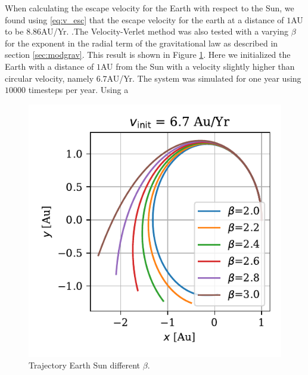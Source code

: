 \documentclass[twocolumn]{aastex62}
\begin{document}
When calculating the escape velocity for the Earth with respect to the Sun, we
found using \ref{eq:v_esc} that the escape velocity for the earth at a distance
of $1$AU to be $8.86$AU/Yr. .The Velocity-Verlet method was also tested with a varying $\beta$ for the
exponent in the radial term of the gravitational law as described in section
\ref{sec:modgrav}. This result is shown in Figure \ref{fig:beta}. Here we
initialized the Earth with a distance of $1$AU from the Sun with a velocity
slightly higher than circular velocity, namely $6.7$AU/Yr. The system was
simulated for one year using $10000$ timesteps per year. Using a 



\begin{figure}
\includegraphics[scale=1]{Figures/beta.pdf}
\caption{Trajectory Earth Sun different $\beta$.}
\label{fig:beta}
\end{figure}
\end{document}
